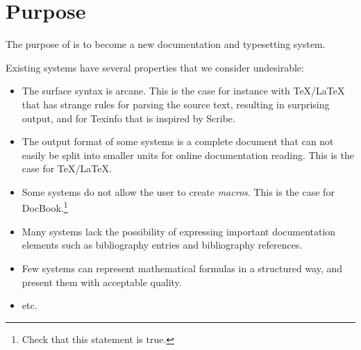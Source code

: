 \chapter{Purpose}
\label{chap-purpose}

The purpose of \sysname{} is to become a new documentation and
typesetting system.

Existing systems have several properties that we consider
undesirable:

\begin{itemize}
\item The surface syntax is arcane.  This is the case for instance
  with TeX/LaTeX that has strange rules for parsing the source text,
  resulting in surprising output, and for Texinfo that is inspired by
  Scribe.
\item The output format of some systems is a complete document that
  can not easily be split into smaller units for online documentation
  reading.  This is the case for TeX/LaTeX.
\item Some systems do not allow the user to create \emph{macros}.
  This is the case for DocBook.\footnote{Check that this statement is
    true.} 
\item Many systems lack the possibility of expressing important
  documentation elements such as bibliography entries and bibliography
  references.
\item Few systems can represent mathematical formulas in a structured
  way, and present them with acceptable quality.
\item etc.
\end{itemize}

